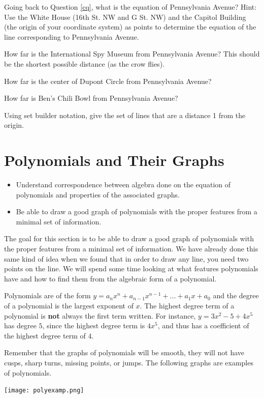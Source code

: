 \bq \be
\item Going back to Question \ref{cq}, what is the equation of Pennsylvania Avenue?  Hint: Use the White House (16th St. NW and G St. NW) and the Capitol Building (the origin of your coordinate system) as points to determine the equation of the line corresponding to Pennsylvania Avenue.
\item How far is the International Spy Museum from Pennsylvania Avenue? This should be the shortest possible distance (as the crow flies).
\item How far is the center of Dupont Circle from Pennsylvania Avenue?
\item How far is Ben's Chili Bowl from Pennsylvania Avenue?
\ee
\eq

\bq Using set builder notation, give the set of lines that are a distance 1 from the origin.
\eq

\section{Polynomials and Their Graphs}
\begin{itemize}
  \item Understand correspondence between algebra done on the equation of polynomials and properties of the associated graphs.
  \item Be able to draw a good graph of polynomials with the proper features from a minimal set of information.
\end{itemize}
The goal for this section is to be able to draw a good graph of polynomials with the proper features from a minimal set of information. We have already done this same kind of idea when we found that in order to draw any line, you need two points on the line.
We will spend some time looking at what features polynomials have and how to find them from the algebraic form of a polynomial.

Polynomials are of the form $y=a_n x^n+a_{n-1} x^{n-1}+ ...+a_1 x+a_0$ and the degree of a polynomial is the largest exponent of $x$. The highest degree term of a polynomial is \textbf{not} always the first term written. For instance, $y=3x^2-5+4x^5$ has degree $5$, since the highest degree term is $4x^5$, and thus has a coefficient of the highest degree term of $4$.

Remember that the graphs of polynomials will be smooth, they will not have cusps, sharp turns, missing points, or jumps. The following graphs are examples of polynomials.

\begin{center} \texttt{[image: polyexamp.png]} \end{center}

